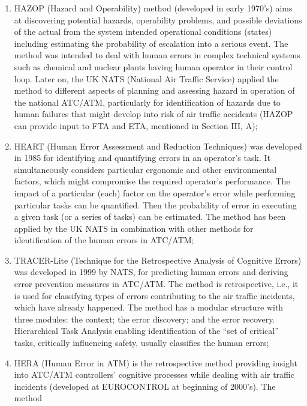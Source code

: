 \documentclass[a4paper, 10pt]{article}
\begin{document}
\begin{enumerate}
		\item HAZOP (Hazard and Operability) method (developed
				in early 1970’s) aims at discovering potential hazards,
				operability problems, and possible deviations of the actual from
				the system intended operational conditions (states) including
				estimating the probability of escalation into a serious event.
				The method was intended to deal with human errors in
				complex technical systems such as chemical and nuclear plants
				having human operator in their control loop. Later on, the UK
				NATS (National Air Traffic Service) applied the method to
				different aspects of planning and assessing hazard in operation
				of the national ATC/ATM, particularly for identification of
				hazards due to human failures that might develop into risk of
				air traffic accidents (HAZOP can provide input to FTA and
				ETA, mentioned in Section III, A);
		\item HEART (Human Error Assessment and Reduction
				Techniques) was developed in 1985 for identifying and
				quantifying errors in an operator’s task. It simultaneously
				considers particular ergonomic and other environmental
				factors, which might compromise the required operator’s
				performance. The impact of a particular (each) factor on the
				operator’s error while performing particular tasks can be
				quantified. Then the probability of error in executing a given
				task (or a series of tasks) can be estimated. The method has
				been applied by the UK NATS in combination with other
				methods for identification of the human errors in ATC/ATM;
		\item TRACER-Lite (Technique for the Retrospective
				Analysis of Cognitive Errors) was developed in 1999 by
				NATS, for predicting human errors and deriving error
				prevention measures in ATC/ATM. The method is
				retrospective, i.e., it is used for classifying types of errors
				contributing to the air traffic incidents, which have already
				happened. The method has a modular structure with three
				modules: the context; the error discovery; and the error
				recovery. Hierarchical Task Analysis enabling identification of
				the “set of critical” tasks, critically influencing safety, usually
				classifies the human errors;
		\item HERA (Human Error in ATM) is the retrospective
				method providing insight into ATC/ATM controllers’ cognitive
				processes while dealing with air traffic incidents (developed at
				EUROCONTROL at beginning of 2000’s). The method

\end{enumerate}
\end{document}
